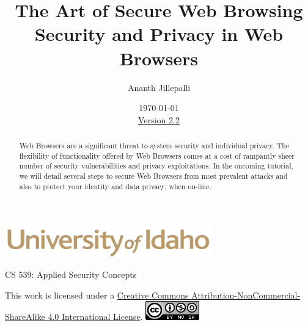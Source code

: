 \documentclass[12pt]{extarticle}
\begin{document}
	\title{ The Art of Secure Web Browsing \\ \large Security and Privacy in Web Browsers}
	\author{Ananth Jillepalli}
	\date{\today \\ \hyperref[changelog]{Version 2.2}} %
	\renewcommand{\abstractname}{Summary}
	\begin{titlepage}
		\maketitle
		\begin{center}
			\includegraphics[scale=.5]{UofI}
			
			\large{CS 539: Applied Security Concepts}
			
			\vskip 40pt
			
		\end{center}
		\begin{abstract}
			Web Browsers are a significant threat to system security and individual privacy. The flexibility of functionality offered by Web Browsers comes at a cost of rampantly sheer number of security vulnerabilities and privacy exploitations. In the oncoming tutorial, we will detail several steps to secure Web Browsers from most prevalent attacks and also to protect your identity and data privacy, when on-line.
		\end{abstract}
		
		
		\vfill
		\begin{center}
		This work is licensed under a \href{https://creativecommons.org/licenses/by-nc-sa/4.0/legalcode}{Creative Commons Attribution-NonCommercial-ShareAlike 4.0 International License}.
		\vskip 10pt
		\includegraphics[scale=.5]{cc}
		\end{center}
		
	\end{titlepage}
	
	
	\pagebreak
	\tableofcontents
	
	
\end{document}

